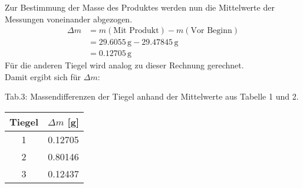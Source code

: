 \documentclass[12pt]{scrartcl} %
\begin{document}
Zur Bestimmung der Masse des Produktes werden nun die Mittelwerte der Messungen voneinander abgezogen.\\
\begin{align*}
  \Delta m &= m(\text{Mit Produkt}) - m(\text{Vor Beginn})\\
  &= 29.6055\,\mathrm{g} - 29.47845\,\mathrm{g}\\
  &= 0.12705\,\mathrm{g}
\end{align*}
Für die anderen Tiegel wird analog zu dieser Rechnung gerechnet.\\
Damit ergibt sich für $\Delta m$:
\newpage
\begin{center}
  Tab.3: Massendifferenzen der Tiegel anhand der Mittelwerte aus Tabelle 1 und 2.\\
  \begin{tabular}{c c}
    \hline
    Tiegel&$\Delta m$ [g]\\
    \hline
    1&0.12705\\
    2&0.80146\\
    3&0.12437\\
    \hline
  \end{tabular}
\end{center}
\end{document}
